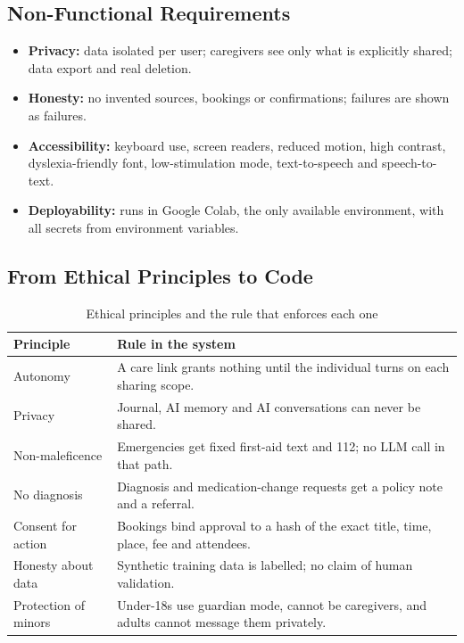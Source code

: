 \documentclass[11pt,a4paper]{article}
\begin{document}
\subsection{Non-Functional Requirements}
\begin{itemize}
  \item \textbf{Privacy:} data isolated per user; caregivers see only what is explicitly shared; data export and real deletion.
  \item \textbf{Honesty:} no invented sources, bookings or confirmations; failures are shown as failures.
  \item \textbf{Accessibility:} keyboard use, screen readers, reduced motion, high contrast, dyslexia-friendly font, low-stimulation mode, text-to-speech and speech-to-text.
  \item \textbf{Deployability:} runs in Google Colab, the only available environment, with all secrets from environment variables.
\end{itemize}

\subsection{From Ethical Principles to Code}
\begin{table}[H]
\centering
\caption{Ethical principles and the rule that enforces each one}
\label{tab:ethics}
\small
\begin{tabularx}{\textwidth}{@{}L{3.4cm}Y@{}}
\toprule
\textbf{Principle} & \textbf{Rule in the system}\\
\midrule
Autonomy & A care link grants nothing until the individual turns on each sharing scope.\\
Privacy & Journal, AI memory and AI conversations can never be shared.\\
Non-maleficence & Emergencies get fixed first-aid text and 112; no LLM call in that path.\\
No diagnosis & Diagnosis and medication-change requests get a policy note and a referral.\\
Consent for action & Bookings bind approval to a hash of the exact title, time, place, fee and attendees.\\
Honesty about data & Synthetic training data is labelled; no claim of human validation.\\
Protection of minors & Under-18s use guardian mode, cannot be caregivers, and adults cannot message them privately.\\
\bottomrule
\end{tabularx}
\end{table}
\end{document}
